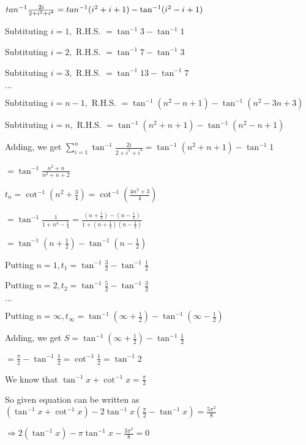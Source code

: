 \item $tan^{-1}\frac{2i}{2 + i^2 + i^4} = \\tan^{-1}(i^2 + i + 1) - \tan^{-1}(i^2 - i + 1)$

  Subtituting $i = 1,$ R.H.S. $= \tan^{-1}3 - \tan^{-1}1$

  Subtituting $i = 2,$ R.H.S. $= \tan^{-1}7 - \tan^{-1}3$

  Subtituting $i = 3,$ R.H.S. $= \tan^{-1}13 - \tan^{-1}7$

  $\ldots$

  Subtituting $i = n - 1,$ R.H.S. $= \tan^{-1}(n^2 - n + 1) - \tan^{-1}(n^2 - 3n + 3)$

  Subtituting $i = n,$ R.H.S. $= \tan^{-1}(n^2 + n + 1) - \tan^{-1}(n^2 - n + 1)$

  Adding, we get $\sum_{i=1}^{n}\tan^{-1}\frac{2i}{2 + i^2 + i^4} = \tan^{-1}(n^2 + n + 1) - \tan^{-1}1$

  $= \tan^{-1}\frac{n^2 + n}{n^2 + n + 2}$

\item $t_n = \cot^{-1}\left(n^2 + \frac{3}{4}\right) = \cot^{-1}\left(\frac{4n^2 + 3}{4}\right)$

  $= \tan^{-1}\frac{1}{1 + n^4 - \frac{1}{4}} = \frac{\left(n + \frac{1}{2}\right) - \left(n - \frac{1}{2}\right)}{1 +
  \left(n + \frac{1}{2}\right)\left(n - \frac{1}{2}\right)}$

  $= \tan^{-1}\left(n + \frac{1}{2}\right) - \tan^{-1}\left(n - \frac{1}{2}\right)$

  Putting $n = 1, t_1 = \tan^{-1}\frac{3}{2} - \tan^{-1}\frac{1}{2}$

  Putting $n = 2, t_2 = \tan^{-1}\frac{5}{2} - \tan^{-1}\frac{3}{2}$

  $\ldots$

  Putting $n = \infty, t_\infty = \tan^{-1}\left(\infty + \frac{1}{2}\right) - \tan^{-1}\left(\infty - \frac{1}{2}\right)$

  Adding, we get $S = \tan^{-1}\left(\infty + \frac{1}{2}\right) - \tan^{-1}\frac{1}{2}$

  $= \frac{\pi}{2} - \tan^{-1}\frac{1}{2} = \cot^{-1}\frac{1}{2} = \tan^{-1}2$

\item We know that $\tan^{-1}x + \cot^{-1}x = \frac{\pi}{2}$

  So given equation can be written as $(\tan^{-1}x + \cot^{-1}x) - 2\tan^{-1}x\left(\frac{\pi}{2} - \tan^{-1}x\right) =
  \frac{5\pi^2}{8}$

  $\Rightarrow 2(\tan^{-1}x) - \pi\tan^{-1}x - \frac{3\pi^2}{8} = 0$

